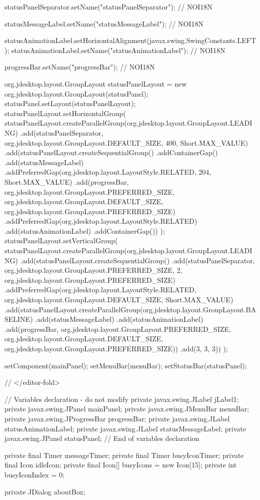 {{        statusPanelSeparator.setName("statusPanelSeparator"); // NOI18N

        statusMessageLabel.setName("statusMessageLabel"); // NOI18N

        statusAnimationLabel.setHorizontalAlignment(javax.swing.SwingConstants.LEFT);
        statusAnimationLabel.setName("statusAnimationLabel"); // NOI18N

        progressBar.setName("progressBar"); // NOI18N

        org.jdesktop.layout.GroupLayout statusPanelLayout = new org.jdesktop.layout.GroupLayout(statusPanel);
        statusPanel.setLayout(statusPanelLayout);
        statusPanelLayout.setHorizontalGroup(
            statusPanelLayout.createParallelGroup(org.jdesktop.layout.GroupLayout.LEADING)
            .add(statusPanelSeparator, org.jdesktop.layout.GroupLayout.DEFAULT_SIZE, 400, Short.MAX_VALUE)
            .add(statusPanelLayout.createSequentialGroup()
                .addContainerGap()
                .add(statusMessageLabel)
                .addPreferredGap(org.jdesktop.layout.LayoutStyle.RELATED, 204, Short.MAX_VALUE)
                .add(progressBar, org.jdesktop.layout.GroupLayout.PREFERRED_SIZE, org.jdesktop.layout.GroupLayout.DEFAULT_SIZE, org.jdesktop.layout.GroupLayout.PREFERRED_SIZE)
                .addPreferredGap(org.jdesktop.layout.LayoutStyle.RELATED)
                .add(statusAnimationLabel)
                .addContainerGap())
        );
        statusPanelLayout.setVerticalGroup(
            statusPanelLayout.createParallelGroup(org.jdesktop.layout.GroupLayout.LEADING)
            .add(statusPanelLayout.createSequentialGroup()
                .add(statusPanelSeparator, org.jdesktop.layout.GroupLayout.PREFERRED_SIZE, 2, org.jdesktop.layout.GroupLayout.PREFERRED_SIZE)
                .addPreferredGap(org.jdesktop.layout.LayoutStyle.RELATED, org.jdesktop.layout.GroupLayout.DEFAULT_SIZE, Short.MAX_VALUE)
                .add(statusPanelLayout.createParallelGroup(org.jdesktop.layout.GroupLayout.BASELINE)
                    .add(statusMessageLabel)
                    .add(statusAnimationLabel)
                    .add(progressBar, org.jdesktop.layout.GroupLayout.PREFERRED_SIZE, org.jdesktop.layout.GroupLayout.DEFAULT_SIZE, org.jdesktop.layout.GroupLayout.PREFERRED_SIZE))
                .add(3, 3, 3))
        );

        setComponent(mainPanel);
        setMenuBar(menuBar);
        setStatusBar(statusPanel);
    }// </editor-fold>

    // Variables declaration - do not modify
    private javax.swing.JLabel jLabel1;
    private javax.swing.JPanel mainPanel;
    private javax.swing.JMenuBar menuBar;
    private javax.swing.JProgressBar progressBar;
    private javax.swing.JLabel statusAnimationLabel;
    private javax.swing.JLabel statusMessageLabel;
    private javax.swing.JPanel statusPanel;
    // End of variables declaration

    private final Timer messageTimer;
    private final Timer busyIconTimer;
    private final Icon idleIcon;
    private final Icon[] busyIcons = new Icon[15];
    private int busyIconIndex = 0;

    private JDialog aboutBox;
}
